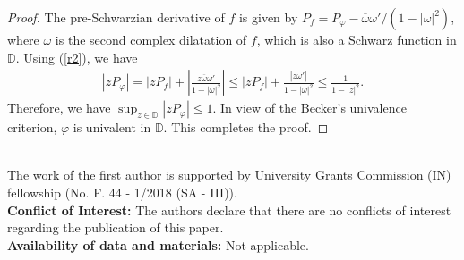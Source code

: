 \documentclass[12pt,reqno]{amsart}
\newtheorem{open problem}{Open problem}[section]
\newcommand{\ol}{\overline}
\newcommand{\beas}{\begin{eqnarray*}}
\newcommand{\eeas}{\end{eqnarray*}}
\renewcommand{\phi}{\varphi}
\numberwithin{equation}{section}
\begin{document}
\begin{proof} The pre-Schwarzian derivative of $f$ is given by $P_f=P_\phi-\ol{\omega}\omega'/\left(1-|\omega|^2\right)$,
where $\omega$ is the second complex dilatation of $f$, which is also a Schwarz function in $\mathbb{D}$. Using (\ref{r2}), we have 
\beas \left|z P_\phi\right|=\left|z P_f\right|+\left|\frac{z\ol{\omega}\omega'}{1-|\omega|^2}\right|\leq \left|z P_f\right|+\frac{\left|z\omega'\right|}{1-|\omega|^2}\leq \frac{1}{1-|z|^2}.\eeas
Therefore, we have $\sup_{z\in\mathbb{D}}|zP_\phi|\leq 1$. In view of the Becker's univalence criterion, $\phi$ is univalent in $\mathbb{D}$. This completes the proof.
\end{proof}
\\
 The work of the first author is supported by University Grants Commission (IN) fellowship (No. F. 44 - 1/2018 (SA - III)).\\
{\bf Conflict of Interest:} The authors declare that there are no conflicts of interest regarding the publication of this paper.\\
{\bf Availability of data and materials:} Not applicable.
\end{document}
